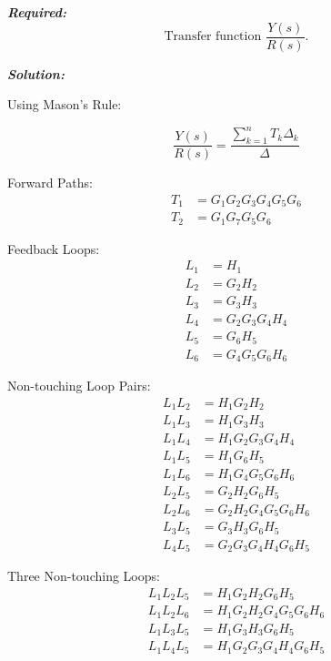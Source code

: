 \documentclass[11pt]{article}
\begin{document}
\vspace{12pt}

\noindent\textbf{\textit{Required:}}
\[
\text{Transfer function } \frac{Y(s)}{R(s)}.
\]

\vspace{12pt}

\noindent \textbf{\textit{Solution:}}

\vspace{2pt}
{Using Mason's Rule:}

\[
\frac{Y(s)}{R(s)} = \frac{\sum_{k=1}^{n} T_k \Delta_k}{\Delta}
\]

Forward Paths:
\begin{align*}
T_1 &= G_1 G_2 G_3 G_4 G_5 G_6 \\
T_2 &= G_1 G_7 G_5 G_6
\end{align*}

\vspace{0.5em}

Feedback Loops:
\begin{align*}
L_1 &= H_1 \\
L_2 &= G_2 H_2 \\
L_3 &= G_3 H_3 \\
L_4 &= G_2 G_3 G_4 H_4 \\
L_5 &= G_6 H_5 \\
L_6 &= G_4 G_5 G_6 H_6
\end{align*}

\vspace{0.5em}

Non-touching Loop Pairs:
\begin{align*}
L_1 L_2 &= H_1 G_2 H_2 \\
L_1 L_3 &= H_1 G_3 H_3 \\
L_1 L_4 &= H_1 G_2 G_3 G_4 H_4 \\
L_1 L_5 &= H_1 G_6 H_5 \\
L_1 L_6 &= H_1 G_4 G_5 G_6 H_6 \\
L_2 L_5 &= G_2 H_2 G_6 H_5 \\
L_2 L_6 &= G_2 H_2 G_4 G_5 G_6 H_6 \\
L_3 L_5 &= G_3 H_3 G_6 H_5 \\
L_4 L_5 &= G_2 G_3 G_4 H_4 G_6 H_5
\end{align*}

\vspace{0.5em}

Three Non-touching Loops:
\begin{align*}
L_1 L_2 L_5 &= H_1 G_2 H_2 G_6 H_5 \\
L_1 L_2 L_6 &= H_1 G_2 H_2 G_4 G_5 G_6 H_6 \\
L_1 L_3 L_5 &= H_1 G_3 H_3 G_6 H_5 \\
L_1 L_4 L_5 &= H_1 G_2 G_3 G_4 H_4 G_6 H_5
\end{align*}
\end{document}
